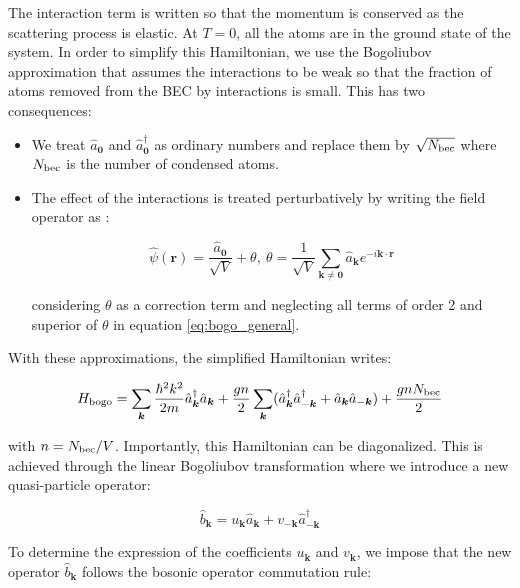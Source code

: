 \noindent The interaction term is written so that the momentum is conserved as the scattering process is elastic. At $T=0$, all the atoms are in the ground state of the system. In order to simplify this Hamiltonian, we use the Bogoliubov approximation that assumes the interactions to be weak so that the fraction of atoms removed from the BEC by interactions is small. This has two consequences:

\begin{itemize}
    \item We treat $\hat{a}_{\bm{0}}$ and $\hat{a}^{\dagger}_{\bm{0}}$ as ordinary numbers and replace them by $\sqrt{N_{\rm{bec}}}$ where $N_{\rm{bec}}$ is the number of condensed atoms. 
    \item The effect of the interactions is treated perturbatively by writing the field operator as \cite{bogoliubov1947}:
    
    \begin{equation}
        \hat{\psi}(\bm{r}) = \frac{\hat{a}_{\bm{0}}}{\sqrt{V}} + \theta, \ \theta = \frac{1}{\sqrt{V}}  \sum_{\bm{k} \neq \bm{0}} \hat{a}_{\bm{k}} e^{-i \bm{k} \cdot \bm{r}}
    \end{equation}
    
    considering $\theta$ as a correction term and neglecting all terms of order 2 and superior of $\theta$ in equation \ref{eq:bogo_general}. 
    
\end{itemize}

\noindent With these approximations, the simplified Hamiltonian writes:

\begin{equation}
    H_{\rm{bogo}}=\sum_{\bm{k}}\frac{\hbar^2 k^2}{2m} \hat{a}^{\dagger}_{\bm{k}}  \hat{a}_{\bm{k}} +  \frac{gn}{2} \sum_{\bm{k}} (\hat{a}^{\dagger}_{\bm{k}} \hat{a}^{\dagger}_{-\bm{k}} +\hat{a}_{\bm{k}} \hat{a}_{-\bm{k}})+\frac{gnN_{\rm{bec}}}{2}
\end{equation}

\noindent with $n=N_{\rm{bec}}/V$. Importantly, this Hamiltonian can be diagonalized. This is achieved through the linear Bogoliubov transformation where we introduce a new quasi-particle operator:

\begin{equation}
    \hat{b}_{\bm{k}}=u_{\bm{k}} \hat{a}_{\bm{k}} + v_{-\bm{k}} \hat{a}^{\dagger}_{-\bm{k}}
\end{equation}

\noindent To determine the expression of the coefficients $u_{\bm{k}}$ and $v_{\bm{k}}$, we impose that the new operator $\hat{b}_{\bm{k}}$ follows the bosonic operator commutation rule:

